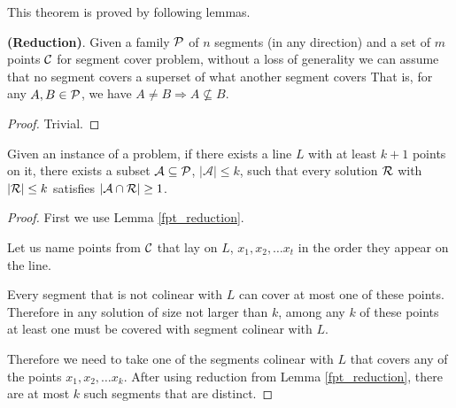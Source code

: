 This theorem is proved by following lemmas.

\begin{lemma}
   \label{fpt_reduction}
   \textbf{(Reduction)}.
   Given a family $\mathcal{P}$ of
	$n$ segments (in any direction)
	and a set of $m$ points $\mathcal{C}$
	for segment cover problem,
   without a loss of generality we can assume that
   no segment covers a superset of what another segment covers
   That is, for any $A, B \in \mathcal{P}$, we have
   $A \neq B \Rightarrow A \not \subseteq B$.
\end{lemma}   
   
\begin{proof} Trivial. \end{proof}

\begin{lemma}
	\label{fpt_long_lines}
	Given an instance of a problem, if there exists a line $L$ with at least
	$k+1$ points on it, there exists a subset $\mathcal{A} \subseteq \mathcal{P}$,
	$|\mathcal{A}| \le k$,
	such that every solution $\mathcal{R}$ with $|\mathcal{R}| \le k$
	satisfies $|\mathcal{A} \cap \mathcal{R}| \ge 1$.
\end{lemma}

\begin{proof}

First we use Lemma \ref{fpt_reduction}.

Let us name points from $\mathcal{C}$ that lay on $L$, $x_1, x_2, \ldots x_t$
in the order they appear on the line.

Every segment that is not colinear with $L$ can cover at most one of these
points. Therefore in any solution of size not larger than $k$,
among any $k$ of these points at least one must
be covered with segment colinear with $L$.

Therefore we need to take one of the segments colinear
with $L$ that covers any of the points
$x_1, x_2, \ldots x_k$. After using reduction from Lemma \ref{fpt_reduction},
there are at most $k$ such segments that are distinct.

\end{proof}



